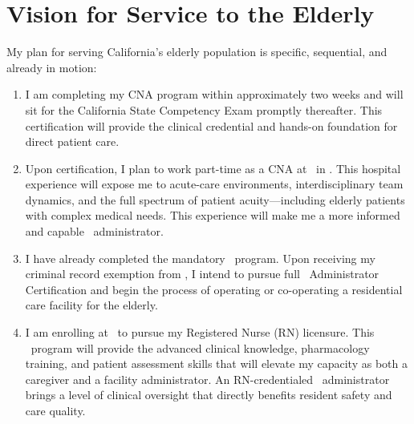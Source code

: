 
\section{Vision for Service to the Elderly}

My plan for serving California's elderly population is specific, sequential, and already in motion:

\begin{enumerate}[leftmargin=2em, itemsep=0.4em]
  \item {} I am completing my CNA program within approximately two weeks and will sit for the California State Competency Exam promptly thereafter. This certification will provide the clinical credential and hands-on foundation for direct patient care.

  \item {} Upon certification, I plan to work part-time as a CNA at \HospitalTarget\ in \HospitalLocation. This hospital experience will expose me to acute-care environments, interdisciplinary team dynamics, and the full spectrum of patient acuity---including elderly patients with complex medical needs. This experience will make me a more informed and capable \FacilityTypeShort\ administrator.

  \item {} I have already completed the mandatory \RCFETraining\ program. Upon receiving my criminal record exemption from \AgencyAbbrev, I intend to pursue full \FacilityTypeShort\ Administrator Certification and begin the process of operating or co-operating a residential care facility for the elderly.

  \item {} I am enrolling at \NursingSchool\ to pursue my Registered Nurse (RN) licensure. This \RNTimeline\ program will provide the advanced clinical knowledge, pharmacology training, and patient assessment skills that will elevate my capacity as both a caregiver and a facility administrator. An RN-credentialed \FacilityTypeShort\ administrator brings a level of clinical oversight that directly benefits resident safety and care quality.


\end{enumerate}
